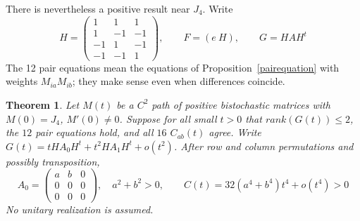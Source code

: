 \documentclass[11pt,a4paper]{article}
\newtheorem{thm}{Theorem}[section]
\begin{document}
There is nevertheless a positive result near $J_4$. Write
\[
 H=\begin{pmatrix}1&1&1\\1&-1&-1\\-1&1&-1\\-1&-1&1\end{pmatrix},
 \qquad F=(e\ H),\qquad G=HAH^t
\]
The 12 pair equations mean the equations of
Proposition~\ref{pairequation} with weights $M_{ia}M_{ib}$; they make
sense even when differences coincide.
\begin{thm}\label{regularflatlimit}
Let $M(t)$ be a $C^2$ path of positive bistochastic matrices with
$M(0)=J_4$, $M'(0)\ne0$. Suppose for all small $t>0$ that
$rank(G(t))\le2$, the $12$ pair equations hold, and all
$16$ $C_{ab}(t)$ agree. Write
$G(t)=tHA_0H^t+t^2HA_1H^t+o(t^2)$.
After row and column permutations and possibly transposition,
\[
 A_0=\begin{pmatrix}a&b&0\\0&0&0\\0&0&0\end{pmatrix},\quad
 a^2+b^2>0,\qquad C(t)=32(a^4+b^4)t^4+o(t^4)>0
\]
No unitary realization is assumed.
\end{thm}
\end{document}
